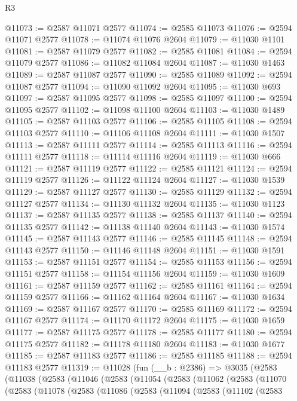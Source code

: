 \begin{lexlean}{R3}
\begin{coremodule}
@11073 := @2587 @11071 @2577
@11074 := @2585 @11073
@11076 := @2594 @11071 @2577
@11078 := @11074 @11076 @2604
@11079 := @11030 @1101
@11081 := @2587 @11079 @2577
@11082 := @2585 @11081
@11084 := @2594 @11079 @2577
@11086 := @11082 @11084 @2604
@11087 := @11030 @1463
@11089 := @2587 @11087 @2577
@11090 := @2585 @11089
@11092 := @2594 @11087 @2577
@11094 := @11090 @11092 @2604
@11095 := @11030 @693
@11097 := @2587 @11095 @2577
@11098 := @2585 @11097
@11100 := @2594 @11095 @2577
@11102 := @11098 @11100 @2604
@11103 := @11030 @1489
@11105 := @2587 @11103 @2577
@11106 := @2585 @11105
@11108 := @2594 @11103 @2577
@11110 := @11106 @11108 @2604
@11111 := @11030 @1507
@11113 := @2587 @11111 @2577
@11114 := @2585 @11113
@11116 := @2594 @11111 @2577
@11118 := @11114 @11116 @2604
@11119 := @11030 @666
@11121 := @2587 @11119 @2577
@11122 := @2585 @11121
@11124 := @2594 @11119 @2577
@11126 := @11122 @11124 @2604
@11127 := @11030 @1539
@11129 := @2587 @11127 @2577
@11130 := @2585 @11129
@11132 := @2594 @11127 @2577
@11134 := @11130 @11132 @2604
@11135 := @11030 @1123
@11137 := @2587 @11135 @2577
@11138 := @2585 @11137
@11140 := @2594 @11135 @2577
@11142 := @11138 @11140 @2604
@11143 := @11030 @1574
@11145 := @2587 @11143 @2577
@11146 := @2585 @11145
@11148 := @2594 @11143 @2577
@11150 := @11146 @11148 @2604
@11151 := @11030 @1591
@11153 := @2587 @11151 @2577
@11154 := @2585 @11153
@11156 := @2594 @11151 @2577
@11158 := @11154 @11156 @2604
@11159 := @11030 @1609
@11161 := @2587 @11159 @2577
@11162 := @2585 @11161
@11164 := @2594 @11159 @2577
@11166 := @11162 @11164 @2604
@11167 := @11030 @1634
@11169 := @2587 @11167 @2577
@11170 := @2585 @11169
@11172 := @2594 @11167 @2577
@11174 := @11170 @11172 @2604
@11175 := @11030 @1659
@11177 := @2587 @11175 @2577
@11178 := @2585 @11177
@11180 := @2594 @11175 @2577
@11182 := @11178 @11180 @2604
@11183 := @11030 @1677
@11185 := @2587 @11183 @2577
@11186 := @2585 @11185
@11188 := @2594 @11183 @2577
@11319 := @11028
    (fun (__b : @2386) =>
    @3035
      (@2583
        (@11038
          (@2583
            (@11046
              (@2583
                (@11054
                  (@2583
                    (@11062
                      (@2583
                        (@11070
                          (@2583
                            (@11078
                              (@2583
                                (@11086
                                  (@2583
                                    (@11094
                                      (@2583
                                        (@11102
                                          (@2583

\end{coremodule}
\end{lexlean}
